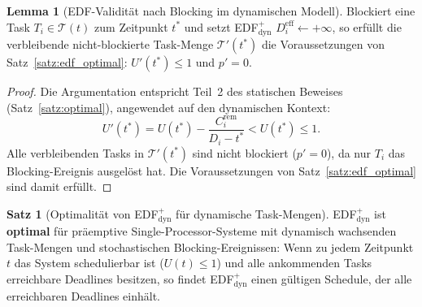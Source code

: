 ﻿\documentclass[a4paper,12pt]{article}
\theoremstyle{definition}
\newtheorem{satz}{Satz}
\newtheorem{lemma}{Lemma}
\begin{document}
	\begin{lemma}[EDF-Validität nach Blocking im dynamischen Modell]
		\label{lem:blocking_dyn}
		Blockiert eine Task $T_i \in \mathcal{T}(t)$ zum Zeitpunkt $t^*$
		und setzt EDF$^+_{\mathrm{dyn}}$ $D_i^{\text{eff}} \leftarrow +\infty$,
		so erfüllt die verbleibende nicht-blockierte Task-Menge
		$\mathcal{T}'(t^*)$ die Voraussetzungen von Satz~\ref{satz:edf_optimal}:
		$U'(t^*) \le 1$ und $p' = 0$.
	\end{lemma}

	\begin{proof}
		Die Argumentation entspricht Teil~2 des statischen Beweises
		(Satz~\ref{satz:optimal}), angewendet auf den dynamischen Kontext:
		\[
		U'(t^*) = U(t^*) - \frac{C_i^{\text{rem}}}{D_i - t^*} < U(t^*) \le 1.
		\]
		Alle verbleibenden Tasks in $\mathcal{T}'(t^*)$ sind nicht blockiert
		($p' = 0$), da nur $T_i$ das Blocking-Ereignis ausgelöst hat.
		Die Voraussetzungen von Satz~\ref{satz:edf_optimal} sind damit erfüllt.
	\end{proof}

	\begin{satz}[Optimalität von EDF$^+_{\mathrm{dyn}}$ für dynamische Task-Mengen]
		\label{satz:optimal_dyn}
		EDF$^+_{\mathrm{dyn}}$ ist \textbf{optimal} für präemptive Single-Processor-Systeme
		mit dynamisch wachsenden Task-Mengen und stochastischen Blocking-Ereignissen:
		Wenn zu jedem Zeitpunkt $t$ das System schedulierbar ist ($U(t) \le 1$) und alle
		ankommenden Tasks erreichbare Deadlines besitzen, so findet
		EDF$^+_{\mathrm{dyn}}$ einen gültigen Schedule, der alle erreichbaren Deadlines
		einhält.
	\end{satz}
\end{document}
